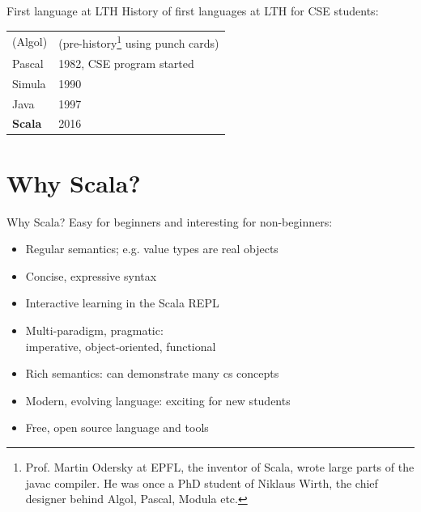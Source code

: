 \documentclass{lecturenotes}
\newcommand{\Section}[1]{\section{#1}\frame{\centering\huge\bfseries\textcolor{blue}{#1}}}
\begin{document}
\begin{Slide}{First language at LTH}%
History of first languages at LTH for CSE students:
\begin{table}
\begin{tabular}{l l}
(Algol) & (pre-history\footnote{Prof. Martin Odersky at EPFL, the inventor of Scala, wrote large parts of the javac compiler. He was once a PhD student of Niklaus Wirth, the chief designer behind Algol, Pascal, Modula etc.} using punch cards) \\
 Pascal & 1982, CSE program started\\
 Simula &  1990 \\
Java &  1997 \\
\textbf{Scala} &  2016 \\
\end{tabular}
\end{table}

\end{Slide}



\Section{Why Scala?}

\begin{Slide}{Why Scala?}
Easy for beginners and interesting for non-beginners:
\begin{itemize}
\item Regular semantics; e.g. value types are real objects
\item Concise, expressive syntax
\item Interactive learning in the Scala REPL
\item Multi-paradigm, pragmatic: \\ imperative, object-oriented, functional
\item Rich semantics: can demonstrate many cs concepts
\item Modern, evolving language: exciting for new students
\item Free, open source language and tools
\end{itemize}
\end{Slide}
\end{document}
